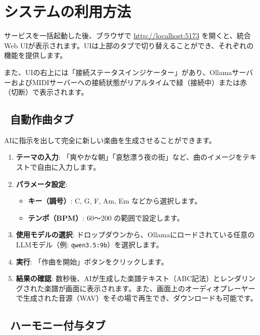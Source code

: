 \section{システムの利用方法}

サービスを一括起動した後、ブラウザで \url{http://localhost:5173} を開くと、統合Web UIが表示されます。UIは上部のタブで切り替えることができ、それぞれの機能を提供します。

また、UIの右上には「接続ステータスインジケーター」があり、OllamaサーバーおよびMIDIサーバーへの接続状態がリアルタイムで緑（接続中）または赤（切断）で表示されます。

\subsection{\texorpdfstring{\faMagic\ 自動作曲タブ}{自動作曲タブ}}

AIに指示を出して完全に新しい楽曲を生成させることができます。

\begin{enumerate}
  \item \textbf{テーマの入力}: 「爽やかな朝」「哀愁漂う夜の街」など、曲のイメージをテキストで自由に入力します。
  \item \textbf{パラメータ設定}:
    \begin{itemize}
      \item \textbf{キー（調号）}: C, G, F, Am, Em などから選択します。
      \item \textbf{テンポ（BPM）}: 60〜200 の範囲で設定します。
    \end{itemize}
  \item \textbf{使用モデルの選択}: ドロップダウンから、Ollamaにロードされている任意のLLMモデル（例: \texttt{qwen3.5:9b}）を選択します。
  \item \textbf{実行}: 「作曲を開始」ボタンをクリックします。
  \item \textbf{結果の確認}: 数秒後、AIが生成した楽譜テキスト（ABC記法）とレンダリングされた楽譜が画面に表示されます。また、画面上のオーディオプレーヤーで生成された音源（WAV）をその場で再生でき、ダウンロードも可能です。
\end{enumerate}

\subsection{\texorpdfstring{\faMusic\ ハーモニー付与タブ}{ハーモニー付与タブ}}

